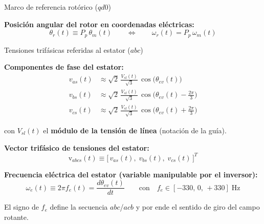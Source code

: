 \documentclass[aspectratio=169,t]{beamer}
\begin{document}
\begin{frame}{Marco de referencia rotórico ($qd0$)}
\vspace{3mm}

\textbf{Posición angular del rotor en coordenadas eléctricas:}
\begin{equation*}
\theta_r(t) \equiv P_p\,\theta_m(t)
\qquad\Longleftrightarrow\qquad
\omega_r(t) = P_p\,\omega_m(t)
\end{equation*}
\end{frame}

\begin{frame}{Tensiones trifásicas referidas al estator ($abc$)}
\vspace{4mm}

\textbf{Componentes de fase del estator:}
\begin{align*}
v_{as}(t) &\approx \sqrt{2}\,\tfrac{V_{sl}(t)}{\sqrt{3}}\,\cos\!\big(\theta_{ev}(t)\big) \\
v_{bs}(t) &\approx \sqrt{2}\,\tfrac{V_{sl}(t)}{\sqrt{3}}\,\cos\!\big(\theta_{ev}(t) - \tfrac{2\pi}{3}\big) \\
v_{cs}(t) &\approx \sqrt{2}\,\tfrac{V_{sl}(t)}{\sqrt{3}}\,\cos\!\big(\theta_{ev}(t) + \tfrac{2\pi}{3}\big)
\end{align*}

con $V_{sl}(t)$ el \textbf{módulo de la tensión de línea} (notación de la guía).


\textbf{Vector trifásico de tensiones del estator:}
\begin{equation*}
\bm{\mathrm{v}}_{abcs}(t) \equiv \big[\,v_{as}(t),\;v_{bs}(t),\;v_{cs}(t)\,\big]^T
\end{equation*}

\textbf{Frecuencia eléctrica del estator (variable manipulable por el inversor):}
\begin{equation*}
\omega_e(t) \equiv 2\pi f_e(t) = \frac{d\theta_{ev}(t)}{dt}
\qquad\text{con}\quad f_e\in[-330,\,0,\,+330]\;\text{Hz}
\end{equation*}

{\small El signo de $f_e$ define la secuencia $abc$/$acb$ y por ende el sentido de giro del campo rotante.}
\end{frame}
\end{document}
